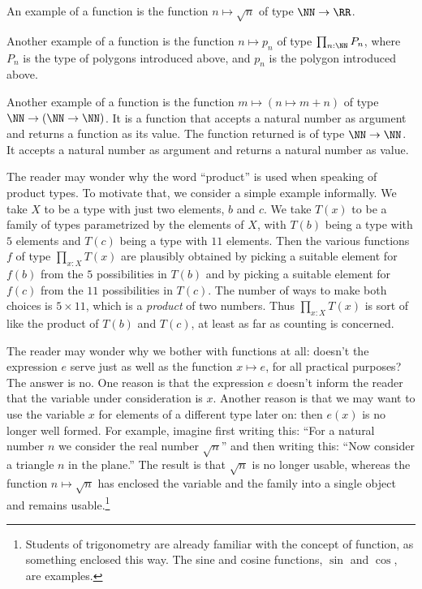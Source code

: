 An example of a function is the function $n \mapsto \sqrt n$ of type $\NN \to \RR$.

Another example of a function is the function $n \mapsto p_n$ of type $\prod_{n:\NN} P_n$, where $P_n$ is the type of polygons introduced above,
and $p_n$ is the polygon introduced above.

Another example of a function is the function $m \mapsto (n \mapsto m+n)$ of type $\NN \to (\NN \to \NN)$.  It is a function that accepts a
natural number as argument and returns a function as its value.  The function returned is of type $\NN \to \NN$.  It accepts a natural number
as argument and returns a natural number as value.

The reader may wonder why the word ``product'' is used when speaking of product types.  To motivate that, we consider a simple example
informally.  We take $X$ to be a type with just two elements, $b$ and $c$.  We take $T(x)$ to be a family of types parametrized by the elements
of $X$, with $T(b)$ being a type with $5$ elements and $T(c)$ being a type with $11$ elements.  Then the various functions $f$ of type
$\prod_{x:X} T(x)$ are plausibly obtained by picking a suitable element for $f(b)$ from the $5$ possibilities in $T(b)$ and by picking a
suitable element for $f(c)$ from the $11$ possibilities in $T(c)$.  The number of ways to make both choices is $5 \times 11$, which is a
\emph{product} of two numbers.  Thus $\prod_{x:X} T(x)$ is sort of like the product of $T(b)$ and $T(c)$, at least as far as counting is
concerned.

The reader may wonder why we bother with functions at all: doesn't the expression $e$ serve just as well as the function $x \mapsto e$, for all
practical purposes?  The answer is no.  One reason is that the expression $e$ doesn't inform the reader that the variable under consideration is
$x$.  Another reason is that we may want to use the variable $x$ for elements of a different type later on: then $e(x)$ is no longer well
formed.  For example, imagine first writing this: ``For a natural number $n$ we consider the real number $\sqrt n$'' and then writing this:
``Now consider a triangle $n$ in the plane.''  The result is that $\sqrt n$ is no longer usable, whereas the function $n \mapsto \sqrt n$ has
enclosed the variable and the family into a single object and remains usable.\footnote{Students of trigonometry are already familiar with the
concept of function, as something enclosed this way.  The sine and cosine functions, $\sin$ and $\cos$, are examples.}

